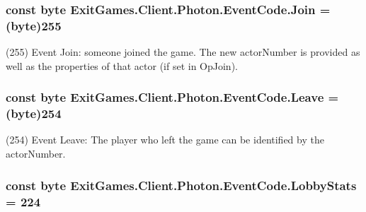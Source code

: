 \subsubsection[{\texorpdfstring{Join}{Join}}]{\setlength{\rightskip}{0pt plus 5cm}const byte Exit\+Games.\+Client.\+Photon.\+Event\+Code.\+Join = (byte)255}\hypertarget{class_exit_games_1_1_client_1_1_photon_1_1_event_code_a27fcfba85aa603b1f153cc7f102acb84}{}\label{class_exit_games_1_1_client_1_1_photon_1_1_event_code_a27fcfba85aa603b1f153cc7f102acb84}


(255) Event Join\+: someone joined the game. The new actor\+Number is provided as well as the properties of that actor (if set in Op\+Join).

\subsubsection[{\texorpdfstring{Leave}{Leave}}]{\setlength{\rightskip}{0pt plus 5cm}const byte Exit\+Games.\+Client.\+Photon.\+Event\+Code.\+Leave = (byte)254}\hypertarget{class_exit_games_1_1_client_1_1_photon_1_1_event_code_ae060da1572222a61fd822406e5df1ef2}{}\label{class_exit_games_1_1_client_1_1_photon_1_1_event_code_ae060da1572222a61fd822406e5df1ef2}


(254) Event Leave\+: The player who left the game can be identified by the actor\+Number.

\subsubsection[{\texorpdfstring{Lobby\+Stats}{LobbyStats}}]{\setlength{\rightskip}{0pt plus 5cm}const byte Exit\+Games.\+Client.\+Photon.\+Event\+Code.\+Lobby\+Stats = 224}\hypertarget{class_exit_games_1_1_client_1_1_photon_1_1_event_code_af1be950c284d416e8a91433c0cb2e9d4}{}\label{class_exit_games_1_1_client_1_1_photon_1_1_event_code_af1be950c284d416e8a91433c0cb2e9d4}


